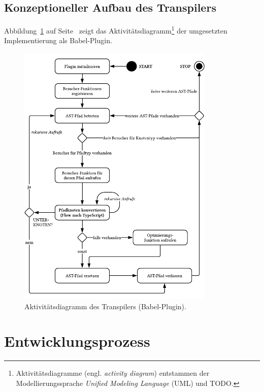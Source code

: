 \subsection{Konzeptioneller Aufbau des Transpilers}

Abbildung~\ref{fig:activity-diagram-transpiler} auf Seite~\pageref{fig:activity-diagram-transpiler} zeigt das Aktivitätsdiagramm\footnote{Aktivitätsdiagramme (engl. \textit{activity diagram}) entstammen der Modellierungssprache \textit{Unified Modeling Language} (UML) und TODO.} der umgesetzten Implementierung als Babel-Plugin.

\begin{figure}[p]
  \centering
  \includegraphics[width=0.84\textwidth]{src/4_Umsetzung/img/activity-diagram-transpiler.pdf}
  \captionsetup{justification=centering}
  \caption{Aktivitätsdiagramm des Transpilers (Babel-Plugin).}
  \label{fig:activity-diagram-transpiler}
\end{figure}

\section{Entwicklungsprozess}

